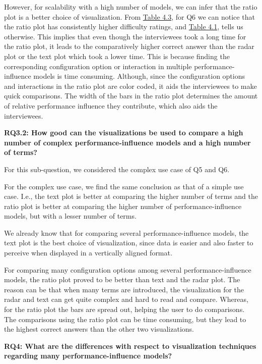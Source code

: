 However, for scalability with a high number of models, we can infer that the ratio plot is a better choice of visualization. 
From \hyperref[table:rating]{Table 4.3}, for Q6 we can notice that the ratio plot has consistently higher difficulty ratings, and  \hyperref[table:correctness]{Table 4.1}, tells us otherwise. This implies that even though the interviewees took a long time for the ratio plot, it leads to the comparatively higher correct answer than the radar plot or the text plot which took a lower time. This is because finding the corresponding configuration option or interaction in multiple performance-influence models is time consuming. Although, since the configuration options and interactions in the ratio plot are color coded, it aids the interviewees to make quick comparisons. The width of the bars in the ratio plot determines the amount of relative performance influence they contribute, which also aids the interviewees.

\vskip 0.2in
\begin{mdframed} 
\textbf{RQ3.2: How good can the visualizations be used to compare a high number of complex performance-influence models and a high number of terms?}
\end{mdframed}

For this sub-question, we considered the complex use case of Q5 and Q6.

For the complex use case, we find the same conclusion as that of a simple use case. I.e., the text plot is better at comparing the higher number of terms and the ratio plot is better at comparing the higher number of performance-influence models, but with a lesser number of terms. 

We already know that for comparing several performance-influence models, the text plot is the best choice of visualization, since data is easier and also faster to perceive when displayed in a vertically aligned format.

For comparing many configuration options among several performance-influence models, the ratio plot proved to be better than text and the radar plot. The reason can be that when many terms are introduced, the visualization for the radar and text can get quite complex and hard to read and compare. Whereas, for the ratio plot the bars are spread out, helping the user to do comparisons. The comparisons using the ratio plot can be time consuming, but they lead to the highest correct answers than the other two visualizations.

\vskip 0.2in
\begin{mdframed}
\textbf {RQ4: What are the differences with respect to visualization techniques regarding many performance-influence models?}
\end{mdframed}

